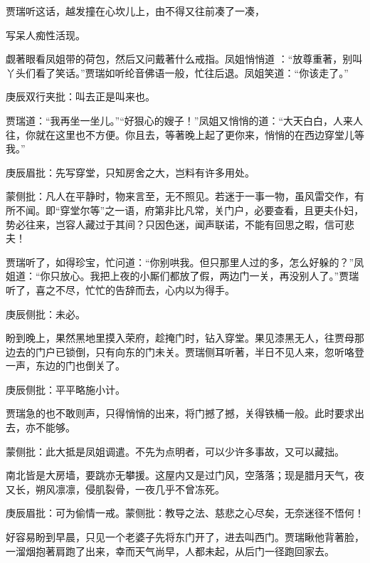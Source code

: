 \begin{parag}
    贾瑞听这话，越发撞在心坎儿上，由不得又往前凑了一凑，\begin{note}写呆人痴性活现。\end{note}觑著眼看凤姐带的荷包，然后又问戴著什么戒指。凤姐悄悄道 ：“放尊重著，别叫丫头们看了笑话。”贾瑞如听纶音佛语一般，忙往后退。凤姐笑道：“你该走了。”\begin{note}庚辰双行夹批：叫去正是叫来也。\end{note}贾瑞道：“我再坐一坐儿。”“好狠心的嫂子！”凤姐又悄悄的道：“大天白白，人来人往，你就在这里也不方便。你且去，等著晚上起了更你来，悄悄的在西边穿堂儿等我。”\begin{note}庚辰眉批：先写穿堂，只知房舍之大，岂料有许多用处。\end{note}\begin{note}蒙侧批：凡人在平静时，物来言至，无不照见。若迷于一事一物，虽风雷交作，有所不闻。即“穿堂尔等”之一语，府第非比凡常，关门户，必要查看，且更夫仆妇，势必往来，岂容人藏过于其间？只因色迷，闻声联诺，不能有回思之暇，信可悲夫！\end{note}贾瑞听了，如得珍宝，忙问道：“你别哄我。但只那里人过的多，怎么好躲的？”凤姐道：“你只放心。我把上夜的小厮们都放了假，两边门一关，再没别人了。”贾瑞听了，喜之不尽，忙忙的告辞而去，心内以为得手。\begin{note}庚辰侧批：未必。\end{note}
\end{parag}


\begin{parag}
    盼到晚上，果然黑地里摸入荣府，趁掩门时，钻入穿堂。果见漆黑无人，往贾母那边去的门户已锁倒，只有向东的门未关。贾瑞侧耳听著，半日不见人来，忽听咯登一声，东边的门也倒关了。\begin{note}庚辰侧批：平平略施小计。\end{note}贾瑞急的也不敢则声，只得悄悄的出来，将门撼了撼，关得铁桶一般。此时要求出去，亦不能够。\begin{note}蒙侧批：此大抵是凤姐调遣。不先为点明者，可以少许多事故，又可以藏拙。\end{note}南北皆是大房墙，要跳亦无攀援。这屋内又是过门风，空落落；现是腊月天气，夜又长，朔风凛凛，侵肌裂骨，一夜几乎不曾冻死。\begin{note}庚辰眉批：可为偷情一戒。蒙侧批：教导之法、慈悲之心尽矣，无奈迷径不悟何！\end{note}好容易盼到早晨，只见一个老婆子先将东门开了，进去叫西门。贾瑞瞅他背著脸，一溜烟抱著肩跑了出来，幸而天气尚早，人都未起，从后门一径跑回家去。
\end{parag}


